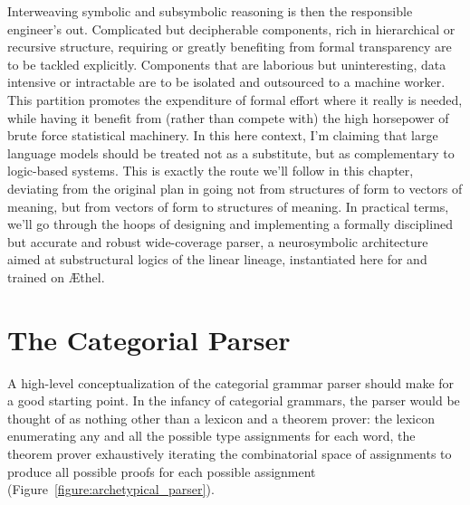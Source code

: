 Interweaving symbolic and subsymbolic reasoning is then the responsible engineer's out.
Complicated but decipherable components, rich in hierarchical or recursive structure, requiring or greatly benefiting from formal transparency are to be tackled explicitly.
Components that are laborious but uninteresting, data intensive or intractable are to be isolated and outsourced to a machine worker.
This partition promotes the expenditure of formal effort where it really is needed, while having it benefit from (rather than compete with) the high horsepower of brute force statistical machinery.
In this here context, I'm claiming that large language models should be treated not as a substitute, but as complementary to logic-based systems.
This is exactly the route we'll follow in this chapter, deviating from the original plan in going not from structures of form to vectors of meaning, but from vectors of form to structures of meaning.
In practical terms, we'll go through the hoops of designing and implementing a formally disciplined but accurate and robust wide-coverage parser, a neurosymbolic architecture aimed at substructural logics of the linear lineage, instantiated here for \NLPplus{} and trained on \AE thel.


\section{The Categorial Parser}
\label{section:parse}
A high-level conceptualization of the categorial grammar parser should make for a good starting point.
In the infancy of categorial grammars, the parser would be thought of as nothing other than a lexicon and a theorem prover: the lexicon enumerating any and all the possible type assignments for each word, the theorem prover exhaustively iterating the combinatorial space of assignments to produce all possible proofs for each possible assignment (Figure~\ref{figure:archetypical_parser}).

